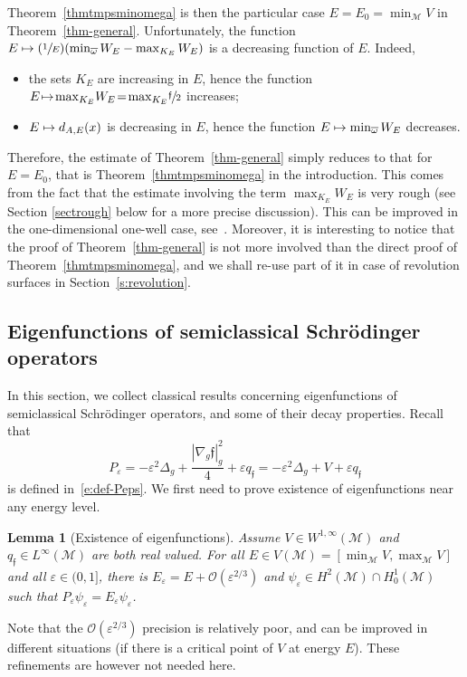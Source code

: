 \documentclass[JEP,XML,SOM,Unicode]{cedram}
\newcommand\mto{\mathchoice{\longmapsto}{\mapsto}{\mapsto}{\mapsto}}
\newcommand{\Psfrac}[2]{(\sfrac{#1}{#2})}
\newtheorem{lemma}{Lemma}[section]
\theoremstyle{definition}
\newcommand{\M}{\ensuremath{\mathcal M}}
\newcommand\grando[1]{\mathcal{O}\left(#1\right)}
\newcommand{\f}{\ensuremath{\mathfrak{f}}}
\newcommand\Lap{\Delta_{g}}
\newcommand\nablag{\nabla_{g}}
\let\eps\varepsilon
\let\ovl\overline
\newcommand{\qf}{q_{\f}}
\begin{document}
Theorem~\ref{thmtmpsminomega} is then the particular case $E=E_0=\min_\M V$ in Theorem~\ref{thm-general}.
Unfortunately, the function $E \mto \Psfrac{1}{E}(\min_{\ovl{\omega}}W_E - \max_{K_E} W_E)$ is a decreasing function of $E$. Indeed,
\begin{itemize}
\item the sets $K_E$ are increasing in $E$, hence the function $E\!\mto\! \max_{K_E} \!W_E\!=\! \max_{K_E} \!\sfrac{\f}{2}$ increases;
\item $E \mto d_{A,E}(x)$ is decreasing in $E$, hence the function $E \mto\min_{\ovl{\omega}}W_E$ decreases.
\end{itemize}
Therefore, the estimate of Theorem~\ref{thm-general} simply reduces to that for $E=E_0$, that is Theorem~\ref{thmtmpsminomega} in the introduction.
This comes from the fact that the estimate involving the term $\max_{K_E} W_E$ is very rough (see Section \ref{sectrough} below for a more precise discussion). This can be improved in the one-dimensional one-well case, see~\cite{LL:20-1D}.
Moreover, it is interesting to notice that the proof of Theorem~\ref{thm-general} is not more involved than the direct proof of Theorem~\ref{thmtmpsminomega}, and we shall re-use part of it in case of revolution surfaces in Section~\ref{s:revolution}.

\subsection{Eigenfunctions of semiclassical Schrödinger operators}
\label{s:sub-eig-schro}
In this section, we collect classical results concerning eigenfunctions of semiclassical Schrödinger operators, and some of their decay properties.
Recall that
\[
P_\eps = - \eps^2 \Lap + \frac{|\nablag \f|_g^2}{4} + \eps \qf = - \eps^2 \Lap + V+ \eps \qf
\]
is defined in~\eqref{e:def-Peps}.
We first need to prove existence of eigenfunctions near any energy level.
\begin{lemma}[Existence of eigenfunctions]
\label{l:exist-eig}
Assume $V \in W^{1,\infty}(\M)$ and $\qf \in L^\infty(\M)$ are both real valued.
For all $E \in V(\M) = [\min_\M V, \max_\M V]$ and all $\eps \in (0,1]$, there is $E_\eps = E + \grando{\eps^{2/3}}$ and $\psi_\eps \in H^2(\M) \cap H^1_0(\M)$ such that $P_\eps \psi_\eps = E_\eps \psi_\eps$.
\end{lemma}
Note that the $\grando{\eps^{2/3}}$ precision is relatively poor, and can be improved in different situations (\eg if there is a critical point of $V$ at energy $E$). These refinements are however not needed here.
\end{document}
